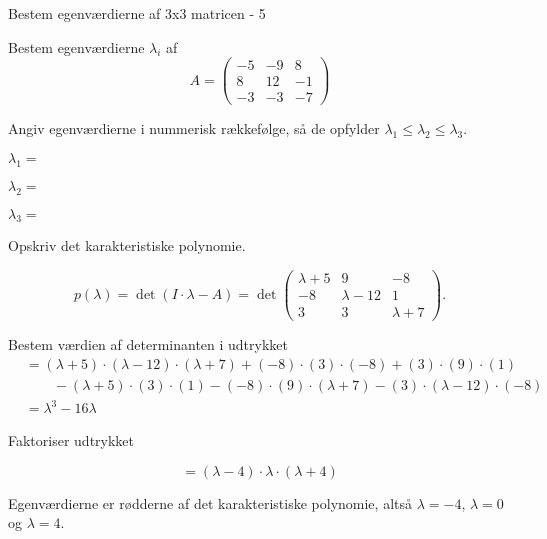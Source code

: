 \documentclass{article}
\begin{document}
\begin{exercise}{Bestem egenværdierne af 3x3 matricen - 5}

Bestem egenværdierne $\lambda_i$ af 
\[
A=\begin{pmatrix}
-5 & -9 & 8 \\
8 & 12 & -1 \\
-3 & -3 & -7
\end{pmatrix}
\]

Angiv egenværdierne i nummerisk rækkefølge, så de
opfylder $\lambda_1 \le \lambda_2 \le \lambda_3$.

$\lambda_1 = $ 

$\lambda_2 = $ 

$\lambda_3 = $ 

\hint
Opskriv det karakteristiske polynomie.

\hint
\[
p(\lambda)=\det\left(I \cdot \lambda - A \right)=\det\begin{pmatrix}
\lambda + 5 & 9 & -8 \\
-8 & \lambda - 12 & 1 \\
3 & 3 & \lambda + 7
\end{pmatrix}.
\]

\hint
Bestem værdien af determinanten i udtrykket
\begin{align*}
&=(\lambda+5) \cdot (\lambda-12) \cdot (\lambda+7)+(-8) \cdot (3) \cdot (-8)+(3) \cdot (9) \cdot (1) \\
&\qquad -(\lambda+5) \cdot (3) \cdot (1)-(-8) \cdot (9) \cdot (\lambda+7)-(3) \cdot (\lambda-12) \cdot (-8) \\
&=\lambda^3-16\lambda
\end{align*}

\hint
Faktoriser udtrykket

\hint
\[
=(\lambda-4) \cdot \lambda \cdot (\lambda+4)
\]

\hint
Egenværdierne er rødderne af det karakteristiske polynomie, 
altså
$\lambda=-4$, $\lambda=0$ og $\lambda=4$.

\end{exercise}
\end{document}
